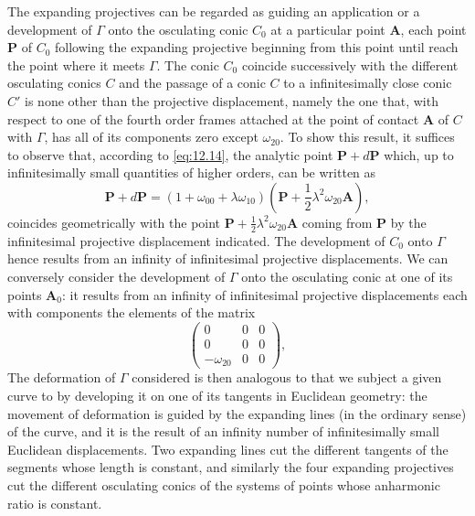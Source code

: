\documentclass[leqno,11pt]{book}
\numberwithin{equation}{chapter}
\theoremstyle{shape1}
\theoremstyle{shapesmall}
\begin{document}
The expanding projectives can be regarded as guiding an application or a development of $\Gamma$ onto the osculating conic $C_{0}$ at a particular point $\mathbf{A}$, each point $\mathbf{P}$ of $C_{0}$ following the expanding projective beginning from this point until reach the point where it meets $\Gamma$. The conic $C_{0}$ coincide successively with the different osculating conics $C$ and the passage of a conic $C$ to a infinitesimally close conic $C'$ is none other than the projective displacement, namely the one that, with respect to one of the fourth order frames attached at the point of contact $\mathbf{A}$ of $C$ with $\Gamma$, has all of its components zero except $\omega_{20}$. To show this result, it suffices to observe that, according to \eqref{eq:12.14}, the analytic point $\mathbf{P}+d\mathbf{P}$ which, up to infinitesimally small quantities of higher orders, can be written as
\[
\mathbf{P}+d\mathbf{P}=(1+\omega_{00}+\lambda\omega_{10})\left(\mathbf{P}+\frac{1}{2}\lambda^{2}\omega_{20}\mathbf{A}\right),
\]
coincides geometrically with the point $\mathbf{P}+\frac{1}{2}\lambda^{2}\omega_{20}\mathbf{A}$ coming from $\mathbf{P}$ by the infinitesimal projective displacement indicated. The development of $C_{0}$ onto $\Gamma$ hence results from an infinity of infinitesimal projective displacements. We can conversely consider the development of $\Gamma$ onto the osculating conic at one of its points $\mathbf{A}_{0}$: it results from an infinity of infinitesimal projective displacements each with components the elements of the matrix
\[
\begin{pmatrix}
  0&0&0\\
  0&0&0\\
  -\omega_{20}&0&0
\end{pmatrix},
\]
The deformation of $\Gamma$ considered is then analogous to that we subject a given curve to by developing it on one of its tangents in Euclidean geometry: the movement of deformation is guided by the expanding lines (in the ordinary sense) of the curve, and it is the result of an infinity number of infinitesimally small Euclidean displacements. Two expanding lines cut the different tangents of the segments whose length is constant, and similarly the four expanding projectives cut the different osculating conics of the systems of points whose anharmonic ratio is constant.
\end{document}
